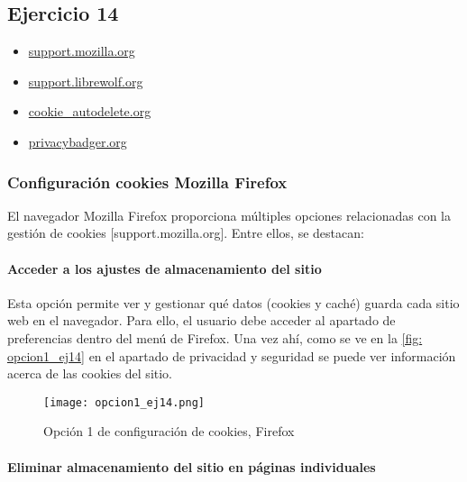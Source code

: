 \subsection{Ejercicio 14}
\graphicspath{ {img/4} }

\begin{itemize}
    \item \href{https://support.mozilla.org/es/kb/Gestionar-la-configuraci%C3%B3n-del-almacenamiento-local-del-sitio?as=u&utm_source=inproduct&redirectslug=permission-store-data&redirectlocale=en-US}{support.mozilla.org}
    \item \href{https://librewolf.net/docs/faq/#how-do-i-stay-logged-into-specific-websites}{support.librewolf.org}
    \item \href{https://addons.mozilla.org/en-US/firefox/addon/cookie-autodelete/}{cookie_autodelete.org}
    \item \href{https://privacybadger.org/}{privacybadger.org}
\end{itemize}


\subsubsection{Configuración cookies Mozilla Firefox}

El navegador Mozilla Firefox proporciona múltiples opciones relacionadas con la gestión de cookies [support.mozilla.org]. Entre ellos, se destacan: 

\paragraph{Acceder a los ajustes de almacenamiento del sitio }

Esta opción permite ver y gestionar qué datos (cookies y caché) guarda cada sitio web en el navegador. Para ello, el usuario debe acceder al apartado de preferencias dentro del menú de Firefox. Una vez ahí, como se ve en la \ref{fig: opcion1_ej14} en el apartado de privacidad y seguridad se puede ver información acerca de las cookies del sitio. 

\begin{figure}[H]   
    \texttt{[image: opcion1\_ej14.png]}
    \caption{Opción 1 de configuración de cookies, Firefox}
    \label{fig:opcion1_ej14}
\end{figure}


\paragraph{Eliminar almacenamiento del sitio en páginas individuales }

